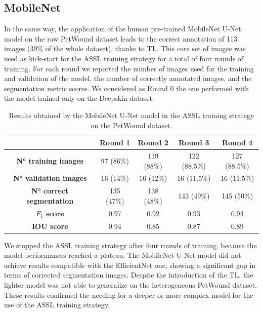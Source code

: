 \documentclass[../main.tex]{subfiles}
\begin{document}
\subsection{MobileNet}
In the same way, the application of the human pre-trained MobileNet U-Net model on the raw PetWound dataset leads to the correct annotation of 113 images (39\% of the whole dataset), thanks to TL. This core set of images was used as kick-start for the ASSL training strategy for a total of four rounds of training.
For each round we reported the number of images used for the training and validation of the model, the number of correctly annotated images, and the segmentation metric scores. We considered as Round 0 the one performed with the model trained only on the Deepskin dataset.
\begin{table}[H]
    \centering
    \begin{tabular}{c|c|c|c|c|}

        \textbf{} & \textbf{Round 1} & \textbf{Round 2} & \textbf{Round 3} & \textbf{Round 4 } \\ \hline
        \textbf{N° training images} & 97 (86\%) & 119 (88\%) & 122 (88.5\%) & 127 (88.5\%)  \\ \hline
        \textbf{N° validation images} & 16 (14\%) & 16 (12\%) & 16 (11.5\%) & 16 (11.5\%)  \\ \hline
        \textbf{N° correct segmentation} & 135 (47\%) & 138 (48\%) & 143 (49\%) & 145 (50\%)  \\ \hline
        \textbf{$F_1$ score} & 0.97 & 0.92 & 0.93 & 0.94  \\ \hline
        \textbf{IOU score} & 0.94 & 0.85 & 0.87 & 0.89  \\ \hline
    \end{tabular}
    \caption{Results obtained by the MobileNet U-Net model in the ASSL training strategy on the PetWound dataset.}
    \label{tab:results-mob-petwound}
\end{table}

We stopped the ASSL training strategy after four rounds of training, because the model performances reached a plateau. The MobileNet U-Net model did not achieve results compatible with the EfficientNet one, showing a significant gap in terms of corrected segmentation images. Despite the introduction of the TL, the lighter model was not able to generalize on the heterogeneous PetWound dataset. These results confirmed the needing for a deeper or more complex model for the use of the ASSL training strategy.
\end{document}
